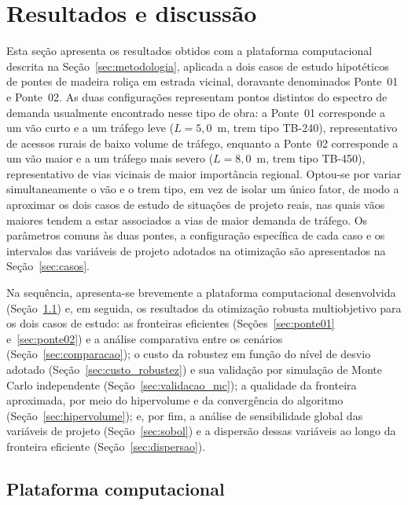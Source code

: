\section{Resultados e discussão}\label{sec:resultados}

Esta seção apresenta os resultados obtidos com a plataforma computacional descrita na Seção~\ref{sec:metodologia}, aplicada a dois casos de estudo hipotéticos de pontes de madeira roliça em estrada vicinal, doravante denominados Ponte~01 e Ponte~02. As duas configurações representam pontos distintos do espectro de demanda usualmente encontrado nesse tipo de obra: a Ponte~01 corresponde a um vão curto e a um tráfego leve ($L = 5{,}0$~m, trem tipo TB-240), representativo de acessos rurais de baixo volume de tráfego, enquanto a Ponte~02 corresponde a um vão maior e a um tráfego mais severo ($L = 8{,}0$~m, trem tipo TB-450), representativo de vias vicinais de maior importância regional. Optou-se por variar simultaneamente o vão e o trem tipo, em vez de isolar um único fator, de modo a aproximar os dois casos de estudo de situações de projeto reais, nas quais vãos maiores tendem a estar associados a vias de maior demanda de tráfego. Os parâmetros comuns às duas pontes, a configuração específica de cada caso e os intervalos das variáveis de projeto adotados na otimização são apresentados na Seção~\ref{sec:casos}.

Na sequência, apresenta-se brevemente a plataforma computacional desenvolvida (Seção~\ref{sec:plataforma}) e, em seguida, os resultados da otimização robusta multiobjetivo para os dois casos de estudo: as fronteiras eficientes (Seções~\ref{sec:ponte01} e~\ref{sec:ponte02}) e a análise comparativa entre os cenários (Seção~\ref{sec:comparacao}); o custo da robustez em função do nível de desvio adotado (Seção~\ref{sec:custo_robustez}) e sua validação por simulação de Monte Carlo independente (Seção~\ref{sec:validacao_mc}); a qualidade da fronteira aproximada, por meio do hipervolume e da convergência do algoritmo (Seção~\ref{sec:hipervolume}); e, por fim, a análise de sensibilidade global das variáveis de projeto (Seção~\ref{sec:sobol}) e a dispersão dessas variáveis ao longo da fronteira eficiente (Seção~\ref{sec:dispersao}).

\subsection{Plataforma computacional}\label{sec:plataforma}

